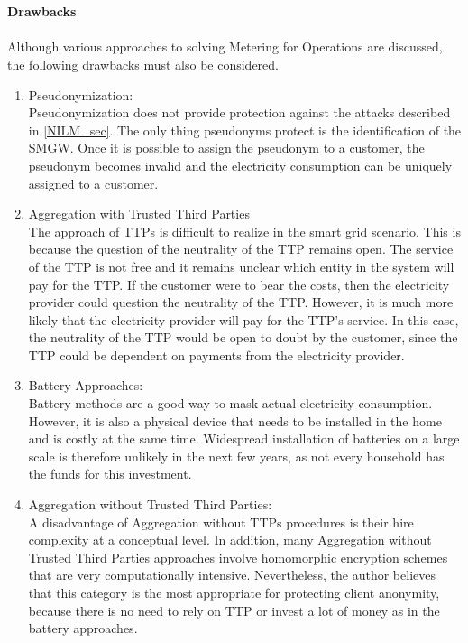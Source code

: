 \\
\\
\textbf{Drawbacks}
\\
\\
Although various approaches to solving Metering for Operations are discussed, the following drawbacks must also be considered.
\begin{enumerate}
\item Pseudonymization:\\
Pseudonymization does not provide protection against the attacks described in \ref{NILM_sec}. The only thing pseudonyms protect is the identification of the SMGW. Once it is possible to assign the pseudonym to a customer, the pseudonym becomes invalid and the electricity consumption can be uniquely assigned to a customer. 

\item Aggregation with Trusted Third Parties\\
The approach of TTPs is difficult to realize in the smart grid scenario. This is because the question of the neutrality of the TTP remains open. The service of the TTP is not free and it remains unclear which entity in the system will pay for the TTP. If the customer were to bear the costs, then the electricity provider could question the neutrality of the TTP. However, it is much more likely that the electricity provider will pay for the TTP's service. In this case, the neutrality of the TTP would be open to doubt by the customer, since the TTP could be dependent on payments from the electricity provider.

\item Battery Approaches:\\
Battery methods are a good way to mask actual electricity consumption. However, it is also a physical device that needs to be installed in the home and is costly at the same time. Widespread installation of batteries on a large scale is therefore unlikely in the next few years, as not every household has the funds for this investment.

\item Aggregation without Trusted Third Parties:\\
A disadvantage of Aggregation without TTPs procedures is their hire complexity at a conceptual level. In addition, many Aggregation without Trusted Third Parties approaches involve homomorphic encryption schemes that are very computationally intensive. Nevertheless, the author believes that this category is the most appropriate for protecting client anonymity, because there is no need to rely on TTP or invest a lot of money as in the battery approaches.
\end{enumerate}
